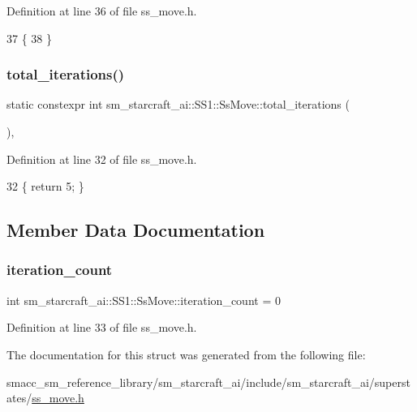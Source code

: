 Definition at line 36 of file ss\+\_\+move.\+h.


\begin{DoxyCode}
37     \{
38     \}
\end{DoxyCode}
\mbox{\label{structsm__starcraft__ai_1_1SS1_1_1SsMove_a3b53c868a59845bc82e7007e42eb9b88}} 
\subsubsection{\texorpdfstring{total\+\_\+iterations()}{total\_iterations()}}
{\footnotesize\ttfamily static constexpr int sm\+\_\+starcraft\+\_\+ai\+::\+S\+S1\+::\+Ss\+Move\+::total\+\_\+iterations (\begin{DoxyParamCaption}{ }\end{DoxyParamCaption})\hspace{0.3cm}{\ttfamily [inline]}, {\ttfamily [static]}}



Definition at line 32 of file ss\+\_\+move.\+h.


\begin{DoxyCode}
32 \{ \textcolor{keywordflow}{return} 5; \}
\end{DoxyCode}


\subsection{Member Data Documentation}
\mbox{\label{structsm__starcraft__ai_1_1SS1_1_1SsMove_aece9d76354fedaeb2a3e4af929ee1175}} 
\subsubsection{\texorpdfstring{iteration\+\_\+count}{iteration\_count}}
{\footnotesize\ttfamily int sm\+\_\+starcraft\+\_\+ai\+::\+S\+S1\+::\+Ss\+Move\+::iteration\+\_\+count = 0}



Definition at line 33 of file ss\+\_\+move.\+h.



The documentation for this struct was generated from the following file\+:\begin{DoxyCompactItemize}
\item 
smacc\+\_\+sm\+\_\+reference\+\_\+library/sm\+\_\+starcraft\+\_\+ai/include/sm\+\_\+starcraft\+\_\+ai/superstates/\hyperlink{ss__move_8h}{ss\+\_\+move.\+h}\end{DoxyCompactItemize}
